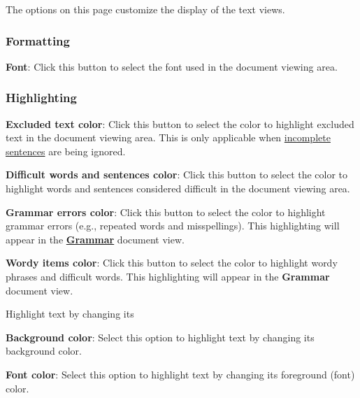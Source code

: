 \documentclass[
]{book}
\newenvironment{optionssection}
    {
    \begin{tcolorbox}[colframe=lightgray,colback=ultralightgray,sharp corners=all,parbox=false]
    }
    {
    \end{tcolorbox}
    }
\newenvironment{optionssectiontitle}
    {
    \begin{tcolorbox}[colframe=lightgray,colback=lightgray]
    \bfseries
    }
    {
    \end{tcolorbox}
    }
\theoremstyle{definition}
\theoremstyle{definition}
\theoremstyle{definition}
\theoremstyle{definition}
\theoremstyle{remark}
\begin{document}
The options on this page customize the display of the text views.

\hypertarget{formatting}{%
\subsubsection*{Formatting}\label{formatting}}

\textbf{Font}: Click this button to select the font used in the document viewing area.

\hypertarget{highlighting}{%
\subsubsection*{Highlighting}\label{highlighting}}

\textbf{Excluded text color}: Click this button to select the color to highlight excluded text in the document viewing area. This is only applicable when \protect\hyperlink{how-text-is-excluded}{incomplete sentences} are being ignored.

\textbf{Difficult words and sentences color}: Click this button to select the color to highlight words and sentences considered difficult in the document viewing area.

\textbf{Grammar errors color}: Click this button to select the color to highlight grammar errors (e.g., repeated words and misspellings). This highlighting will appear in the \protect\hyperlink{reviewing-standard-grammar}{\textbf{Grammar}} document view.

\textbf{Wordy items color}: Click this button to select the color to highlight wordy phrases and difficult words. This highlighting will appear in the \textbf{Grammar} document view.

\begin{optionssection}

\begin{optionssectiontitle}
Highlight text by changing its

\end{optionssectiontitle}

\textbf{Background color}: Select this option to highlight text by changing its background color.

\textbf{Font color}: Select this option to highlight text by changing its foreground (font) color.

\end{optionssection}
\end{document}
